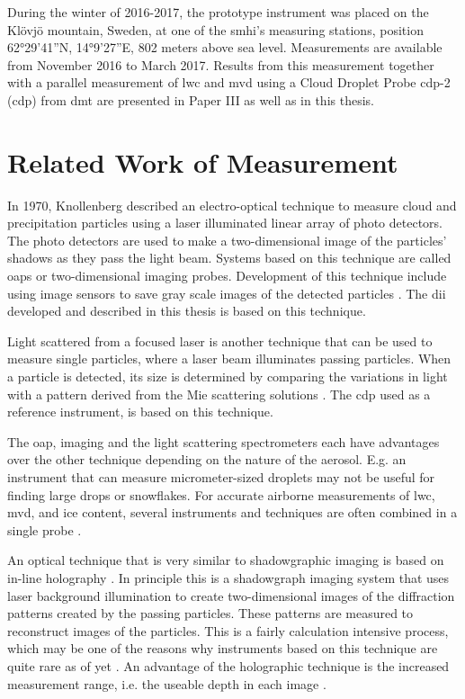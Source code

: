 During the winter of 2016-2017, the prototype instrument was placed on the Klövjö mountain, Sweden, at one of the \gls{smhi}'s measuring stations, position 62°29'41''N, 14°9'27''E, 802 meters above sea level. Measurements are available from November 2016 to March 2017. Results from this measurement together with a parallel measurement of \gls{lwc} and \gls{mvd} using a Cloud Droplet Probe \gls{cdp}-2 (\gls{cdp}) from \gls{dmt} are presented in Paper III as well as in this thesis.

\section{Related Work of Measurement}
\label{sec:relwork}
In 1970, Knollenberg \cite{knoll1970} described an electro-optical technique to measure cloud and precipitation particles using a laser illuminated linear array of photo detectors. The photo detectors are used to make a two-dimensional image of the particles’ shadows as they pass the light beam. Systems based on this technique are called \gls{oap}s or two-dimensional imaging probes. Development of this technique include using image sensors to save gray scale images of the detected particles \cite{kulk2011,wend2013}. The \gls{dii} developed and described in this thesis is based on this technique.

Light scattered from a focused laser \cite{baum1983,dye1984} is another technique that can be used to measure single particles, where a laser beam illuminates passing particles. When a particle is detected, its size is determined by comparing the variations in light with a pattern derived from the Mie scattering solutions \cite{mie1908}. The \gls{cdp} used as a reference instrument, is based on this technique.

The \gls{oap}, imaging and the light scattering spectrometers each have advantages over the other technique depending on the nature of the aerosol. E.g. an instrument that can measure micrometer-sized droplets may not be useful for finding large drops or snowflakes. For accurate airborne measurements of \gls{lwc}, \gls{mvd}, and ice content, several instruments and techniques are often combined in a single probe \cite{baum2001, baum2011}.

An optical technique that is very similar to shadowgraphic imaging is based on in-line holography \cite{laws1995}. In principle this is a shadowgraph imaging system that uses laser background illumination to create two-dimensional images of the diffraction patterns created by the passing particles. These patterns are measured to reconstruct images of the particles. This is a fairly calculation intensive process, which may be one of the reasons why instruments based on this technique are quite rare as of yet \cite{henn2013}. An advantage of the holographic technique is the increased measurement range, i.e. the useable depth in each image \cite{kaikk2014}.

